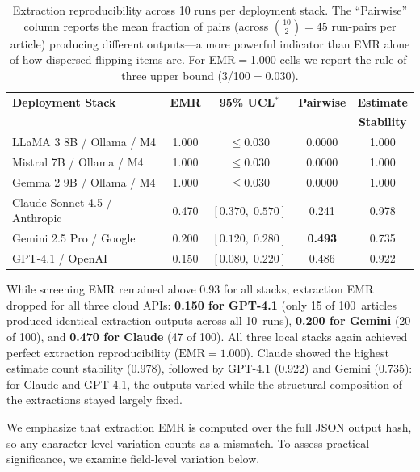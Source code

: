 \documentclass[preprint,review,12pt,authoryear]{elsarticle}
\newcommand{\emr}{\textrm{EMR}}
\newcommand{\ci}[2]{[#1,\;#2]}
\begin{document}
\begin{table}[htbp]
\centering
\caption{Extraction reproducibility across 10 runs per deployment stack. The ``Pairwise'' column reports the mean fraction of pairs (across $\binom{10}{2}{=}45$ run-pairs per article) producing different outputs---a more powerful indicator than EMR alone of how dispersed flipping items are. For EMR${=}$1.000 cells we report the rule-of-three upper bound (3/100${=}$0.030).}
\label{tab:extraction}
\small
\setlength{\tabcolsep}{4pt}
\begin{tabular}{lcccc}
\toprule
\textbf{Deployment Stack} & \textbf{EMR} & \textbf{95\% UCL$^{*}$} & \textbf{Pairwise} & \textbf{Estimate} \\
 & & & & \textbf{Stability} \\
\midrule
LLaMA 3 8B / Ollama / M4       & 1.000 & $\leq$0.030 & 0.0000 & 1.000 \\
Mistral 7B / Ollama / M4       & 1.000 & $\leq$0.030 & 0.0000 & 1.000 \\
Gemma 2 9B / Ollama / M4       & 1.000 & $\leq$0.030 & 0.0000 & 1.000 \\
\midrule
Claude Sonnet 4.5 / Anthropic  & 0.470 & $\ci{0.370}{0.570}$ & 0.241 & 0.978 \\
Gemini 2.5 Pro / Google        & 0.200 & $\ci{0.120}{0.280}$ & \textbf{0.493} & 0.735 \\
GPT-4.1 / OpenAI               & 0.150 & $\ci{0.080}{0.220}$ & 0.486 & 0.922 \\
\bottomrule
\end{tabular}
\par{}
\end{table}

\noindent While screening EMR remained above 0.93 for all stacks, extraction EMR dropped for all three cloud APIs: \textbf{0.150 for GPT-4.1} (only 15 of 100~articles produced identical extraction outputs across all 10~runs), \textbf{0.200 for Gemini} (20 of 100), and \textbf{0.470 for Claude} (47 of 100).
All three local stacks again achieved perfect extraction reproducibility ($\emr{=}1.000$).
Claude showed the highest estimate count stability (0.978), followed by GPT-4.1 (0.922) and Gemini (0.735): for Claude and GPT-4.1, the outputs varied while the structural composition of the extractions stayed largely fixed.

We emphasize that extraction EMR is computed over the full JSON output hash, so any character-level variation counts as a mismatch.
To assess practical significance, we examine field-level variation below.
\end{document}

